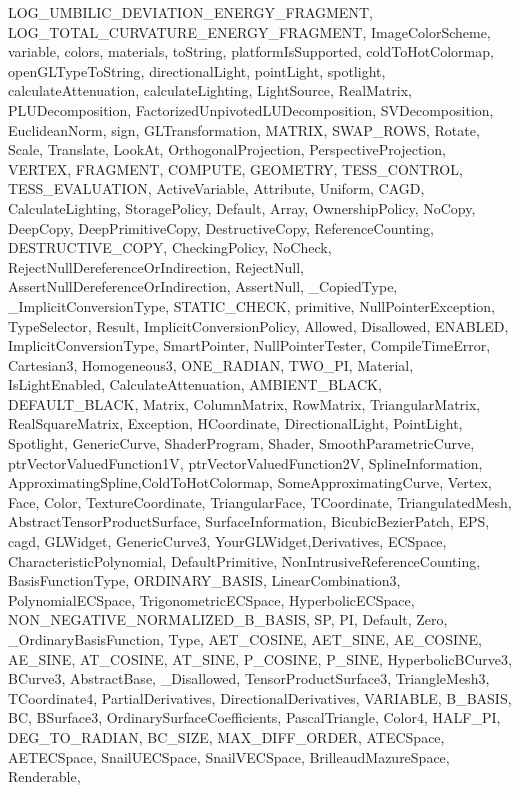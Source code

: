 {{{        LOG_UMBILIC_DEVIATION_ENERGY_FRAGMENT,
        LOG_TOTAL_CURVATURE_ENERGY_FRAGMENT,
        ImageColorScheme,
        variable,
        colors, materials, toString, platformIsSupported, coldToHotColormap, openGLTypeToString,
        directionalLight,
        pointLight,
        spotlight,
        calculateAttenuation,
        calculateLighting,
        LightSource,
        RealMatrix,
        PLUDecomposition,
        FactorizedUnpivotedLUDecomposition,
        SVDecomposition,
        EuclideanNorm,
        sign,
        GLTransformation,
        MATRIX,
        SWAP_ROWS,
        Rotate,
        Scale,
        Translate,
        LookAt,
        OrthogonalProjection,
        PerspectiveProjection,
        VERTEX,
        FRAGMENT,
        COMPUTE,
        GEOMETRY,
        TESS_CONTROL,
        TESS_EVALUATION,
        ActiveVariable,
        Attribute, Uniform,
		CAGD, CalculateLighting,
		StoragePolicy, Default, Array, OwnershipPolicy, NoCopy, DeepCopy, DeepPrimitiveCopy, DestructiveCopy, ReferenceCounting, DESTRUCTIVE_COPY,
		CheckingPolicy, NoCheck, RejectNullDereferenceOrIndirection, RejectNull, AssertNullDereferenceOrIndirection, AssertNull, _CopiedType, _ImplicitConversionType,
		STATIC_CHECK, primitive, NullPointerException, 
		TypeSelector, Result, ImplicitConversionPolicy, Allowed, Disallowed, ENABLED, ImplicitConversionType, SmartPointer, NullPointerTester, CompileTimeError, Cartesian3, Homogeneous3,
		ONE_RADIAN, TWO_PI, Material, IsLightEnabled, CalculateAttenuation, AMBIENT_BLACK, DEFAULT_BLACK,
		Matrix, ColumnMatrix, RowMatrix, TriangularMatrix, RealSquareMatrix, Exception, HCoordinate, DirectionalLight, PointLight, Spotlight,
		GenericCurve, ShaderProgram, Shader,
		SmoothParametricCurve,
		ptrVectorValuedFunction1V,
		ptrVectorValuedFunction2V,
		SplineInformation,
		ApproximatingSpline,ColdToHotColormap,
		SomeApproximatingCurve,
		Vertex, Face, Color, TextureCoordinate, TriangularFace, TCoordinate, TriangulatedMesh, AbstractTensorProductSurface, SurfaceInformation, BicubicBezierPatch,
		EPS, cagd, GLWidget, GenericCurve3, YourGLWidget,Derivatives,
		ECSpace, CharacteristicPolynomial, DefaultPrimitive, NonIntrusiveReferenceCounting, BasisFunctionType, ORDINARY_BASIS, LinearCombination3, PolynomialECSpace, TrigonometricECSpace, HyperbolicECSpace, NON_NEGATIVE_NORMALIZED_B_BASIS, SP, PI, Default, Zero, _OrdinaryBasisFunction, Type, AET_COSINE, AET_SINE, AE_COSINE, AE_SINE, AT_COSINE, AT_SINE, P_COSINE, P_SINE, HyperbolicBCurve3, BCurve3, AbstractBase, _Disallowed, TensorProductSurface3, TriangleMesh3, TCoordinate4, PartialDerivatives, DirectionalDerivatives, VARIABLE, B_BASIS, BC, BSurface3, OrdinarySurfaceCoefficients, PascalTriangle, Color4, HALF_PI, DEG_TO_RADIAN, BC_SIZE, MAX_DIFF_ORDER, ATECSpace, AETECSpace, SnailUECSpace, SnailVECSpace, BrilleaudMazureSpace, Renderable}, 
}}
